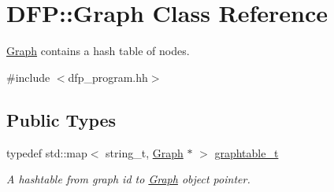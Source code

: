 \hypertarget{class_d_f_p_1_1_graph}{}\section{D\+FP\+:\+:Graph Class Reference}
\label{class_d_f_p_1_1_graph}


\hyperlink{class_d_f_p_1_1_graph}{Graph} contains a hash table of nodes.  




{\ttfamily \#include $<$dfp\+\_\+program.\+hh$>$}

\subsection*{Public Types}
\begin{DoxyCompactItemize}
\item 
typedef std\+::map$<$ string\+\_\+t, \hyperlink{class_d_f_p_1_1_graph}{Graph} $\ast$ $>$ \hyperlink{class_d_f_p_1_1_graph_ae35638adb932f3b7fd545ac09ea34c5a}{graphtable\+\_\+t}\hypertarget{class_d_f_p_1_1_graph_ae35638adb932f3b7fd545ac09ea34c5a}{}\label{class_d_f_p_1_1_graph_ae35638adb932f3b7fd545ac09ea34c5a}

\begin{DoxyCompactList}\small\item\em A hashtable from graph id to \hyperlink{class_d_f_p_1_1_graph}{Graph} object pointer. \end{DoxyCompactList}\end{DoxyCompactItemize}

